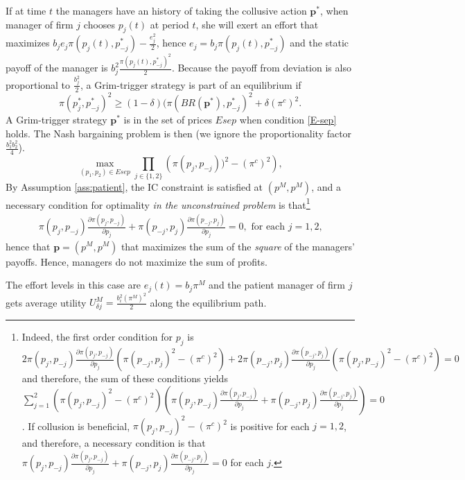 \documentclass[]{article}
\newcommand{\p}{\mathbf p}
\begin{document}
If at time $t$ the managers have an history of taking the collusive action $\p^*$, when manager of firm $j$ chooses $p_j(t)$ at period $t$, she will exert an effort that maximizes $b_je_j\pi(p_j(t),p^*_{-j})-\frac{e_j^2}{2}$, hence $e_j=b_j\pi(p_j(t),p^*_{-j})$ and the static payoff of the manager is $b_j^2\frac{\pi(p_j(t),p^*_{-j})^2}{2}$. Because the payoff from deviation is also proportional to $\frac{b_j^2}{2}$, a Grim-trigger strategy is part of an equilibrium if
%
\begin{equation}\label{E-sep}
\pi(p^*_j,p^*_{-j})^2\geq (1-\delta)(\pi(BR(\p^*),p^*_{-j})^2+\delta (\pi^c)^2.	
\end{equation}
%
A Grim-trigger strategy $\p^*$ is in the set of prices $Esep$ when condition \eqref{E-sep} holds. The Nash bargaining problem is then (we ignore the proportionality factor $\frac{b_1^2b_2^2}{4}$).
\begin{equation*}
\max_{(p_1,p_2)\in Esep} \prod_{j\in\{1,2\}} \left(\pi(p_j,p_{-j}))^2 -(\pi^c)^2\right),
\end{equation*}
%
By Assumption \ref{ass:patient}, the IC constraint is satisfied at $(p^M,p^M)$, and a necessary condition for optimality \emph{in the unconstrained problem} is that\footnote{%
Indeed, the first order condition for $p_j$ is  
$2\pi(p_j,p_{-j})\frac{\partial \pi(p_j,p_{-j})}{\partial p_j}(\pi(p_{-j},p_j)^2-(\pi^c)^2)+2\pi(p_{-j},p_j)\frac{\partial \pi(p_{-j},p_j)}{\partial p_j}(\pi(p_j,p_{-j})^2-(\pi^c)^2)=0$
and therefore, the sum of these conditions yields $\sum_{j=1}^2
(\pi(p_j,p_{-j})^2-(\pi^c)^2)\left(\pi(p_j,p_{-j})\frac{\partial \pi(p_{j},p_{-j})}{\partial p_j}+\pi(p_{-j},p_j)\frac{\partial \pi(p_{-j},p_j)}{\partial p_j}\right)=0$. If collusion is beneficial, $\pi(p_j,p_{-j})^2-(\pi^c)^2$ is positive for each $j=1,2$, and therefore, a necessary condition is that $\pi(p_j,p_{-j})\frac{\partial \pi(p_{j},p_{-j})}{\partial p_j}+\pi(p_{-j},p_j)\frac{\partial \pi(p_{-j},p_{j})}{\partial p_j}=0$ for each $j$.
}
\begin{align*}
\pi(p_j,p_{-j})\frac{\partial \pi(p_j,p_{-j})}{\partial p_j} + \pi(p_{-j},p_j)\frac{\partial \pi(p_{-j},p_j)}{\partial p_j}=0, \text{ for each $j=1,2$,}
\end{align*}
hence that $\p=(p^M,p^M)$ that maximizes the sum of the \emph{square} of the managers' payoffs. Hence, managers do not maximize the sum of profits.

The effort levels in this case are $e_j(t)=b_j\pi^M$ and the patient manager of firm $j$ gets average utility $U_{\delta j}^M=\frac{b_i^2{ (\pi^M)}^2}{2}$ along the equilibrium path.
%
\end{document}
